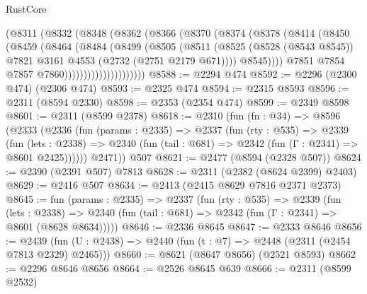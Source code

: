 \begin{lexlean}{RustCore}
\begin{coremodule}
                        (@8311
                          (@8332
                            (@8348
                              (@8362
                                (@8366
                                  (@8370
                                    (@8374
                                      (@8378
                                        (@8414
                                          (@8450
                                            (@8459
                                              (@8464
                                                (@8484
                                                  (@8499
                                                    (@8505
                                                      (@8511
                                                        (@8525
                                                          (@8528 (@8543 @8545))
                                                          @7821
                                                          @3161
                                                          @4553
                                                          (@2732 (@2751 @2179 @671))))
                                                      @8545))))
                                              @7851
                                              @7854
                                              @7857
                                              @7860)))))))))))))))))))))
@8588 := @2294 @474
@8592 := @2296 (@2300 @474) (@2306 @474)
@8593 := @2325 @474
@8594 := @2315 @8593
@8596 := @2311 (@8594 @2330)
@8598 := @2353 (@2354 @474)
@8599 := @2349 @8598
@8601 := @2311 (@8599 @2378)
@8618 := @2310
    (fun (fn : @34) =>
    @8596
      (@2333
        (@2336
          (fun (params : @2335) =>
          @2337
            (fun (rty : @535) =>
            @2339
              (fun (lets : @2338) =>
              @2340 (fun (tail : @681) => @2342 (fun (Γ : @2341) => @8601 @2425))))))
        @2471))
    @507
@8621 := @2477 (@8594 (@2328 @507))
@8624 := @2390 (@2391 @507) @7813
@8628 := @2311 (@2382 (@8624 @2399) @2403)
@8629 := @2416 @507
@8634 := @2413 (@2415 @8629 @7816 @2371 @2373)
@8645 := fun (params : @2335) =>
  @2337
    (fun (rty : @535) =>
    @2339
      (fun (lets : @2338) =>
      @2340 (fun (tail : @681) => @2342 (fun (Γ : @2341) => @8601 (@8628 @8634)))))
@8646 := @2336 @8645
@8647 := @2333 @8646
@8656 := @2439 (fun (U : @2438) => @2440 (fun (t : @7) => @2448 (@2311 (@2454 @7813 @2329) @2465)))
@8660 := @8621 (@8647 @8656) (@2521 @8593)
@8662 := @2296 @8646 @8656
@8664 := @2526 @8645 @639
@8666 := @2311 (@8599 @2532)

\end{coremodule}
\end{lexlean}
